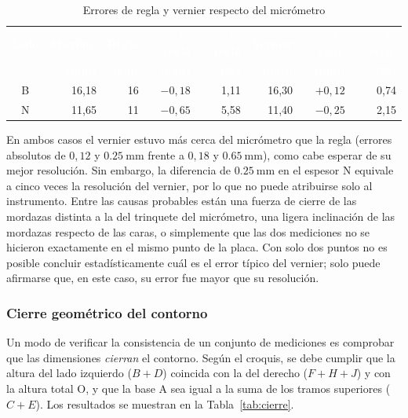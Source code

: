 \documentclass[12pt,a4paper]{article}
\newcommand{\encab}[1]{\textcolor{white}{\sffamily\bfseries #1}}
\begin{document}
\begin{table}[!htb]
	\centering
	\caption{Errores de regla y vernier respecto del micrómetro}\label{tab:micro}
	\small
	\begin{tabular}{c r r r r r r r}
		\rowcolor{darkblue}
		\encab{Lado}        & \encab{Micróm.} & \encab{Regla}       & \encab{$E_a$
			                                                              regla} &
		\encab{$E_r$ regla} & \encab{Vernier} & \encab{$E_a$ vern.} & \encab{$E_r$
			                                                              vern.}
		\\
		\rowcolor{darkblue}
		                    & \encab{(mm)}    & \encab{(mm)}        & \encab{(mm)}
		                    &
		\encab{(\%)}        & \encab{(mm)}    & \encab{(mm)}        & \encab{(\%)}
		\\
		B                   & 16,18           & 16                  & $-0{,}18$    &
		1,11
		                    & 16,30           & $+0{,}12$           & 0,74
		\\
		N                   & 11,65           & 11                  & $-0{,}65$    &
		5,58
		                    & 11,40           & $-0{,}25$           & 2,15
		\\
	\end{tabular}
\end{table}

En ambos casos el vernier estuvo más cerca del micrómetro que la regla (errores
absolutos de $0{,}12$ y $\SI{0.25}{\milli\metre}$ frente a $0{,}18$ y
$\SI{0.65}{\milli\metre}$), como cabe esperar de su mejor resolución. Sin
embargo, la diferencia de $\SI{0.25}{\milli\metre}$ en el espesor N equivale a
cinco veces la resolución del vernier, por lo que no puede atribuirse solo al
instrumento. Entre las causas probables están una fuerza de cierre de las
mordazas distinta a la del trinquete del micrómetro, una ligera inclinación de
las mordazas respecto de las caras, o simplemente que las dos mediciones no se
hicieron exactamente en el mismo punto de la placa. Con solo dos puntos no es
posible concluir estadísticamente cuál es el error típico del vernier; solo
puede afirmarse que, en este caso, su error fue mayor que su resolución.

\subsubsection{Cierre geométrico del contorno}

Un modo de verificar la consistencia de un conjunto de mediciones es comprobar
que las dimensiones \emph{cierran} el contorno. Según el croquis, se debe
cumplir que la altura del lado izquierdo ($B+D$) coincida con la del derecho
($F+H+J$) y con la altura total O, y que la base A sea igual a la suma de los
tramos superiores ($C+E$). Los resultados se muestran en la
Tabla~\ref{tab:cierre}.
\end{document}
